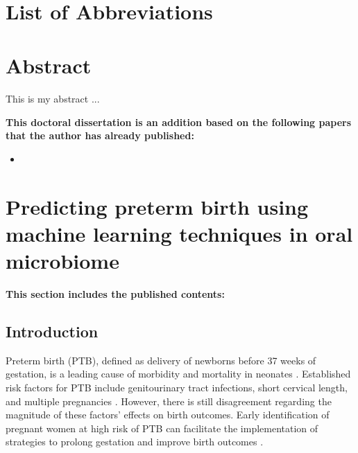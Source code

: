 \documentclass[11pt, a4paper, onecolumn, oneside]{report}
\begin{document}
\hbox{ }
\thispagestyle{empty}
\clearpage

\tableofcontents{}
\thispagestyle{empty}
\vfill
\clearpage

\listoffigures{}
\thispagestyle{empty}
\clearpage

\listoftables{}
\thispagestyle{empty}
\clearpage

\setcounter{page}{1}

    \section*{List of Abbreviations}
    \printacronyms[display=all, heading=none]
    \newpage

    \section{Abstract}
        This is my abstract ...

        \textbf{This doctoral dissertation is an addition based on the following papers that the author has already published:}
        \begin{itemize}
            \item  \nocite{PTB-JW-1}
        \end{itemize}
    \newpage

    \section{Predicting preterm birth using machine learning techniques in oral microbiome}
        \label{section:PTB}

        \textbf{This section includes the published contents:} \\
         \nocite{PTB-JW-1}

        \subsection{Introduction}
            Preterm birth (PTB), defined as delivery of newborns before 37 weeks of gestation, is a leading cause of morbidity and mortality in neonates \cite{PTB-rate-1}. Established risk factors for PTB include genitourinary tract infections, short cervical length, and multiple pregnancies \cite{PTB-cause-1}. However, there is still disagreement regarding the magnitude of these factors’ effects on birth outcomes. Early identification of pregnant women at high risk of PTB can facilitate the implementation of strategies to prolong gestation and improve birth outcomes \cite{PTB-care-1}.
\end{document}
